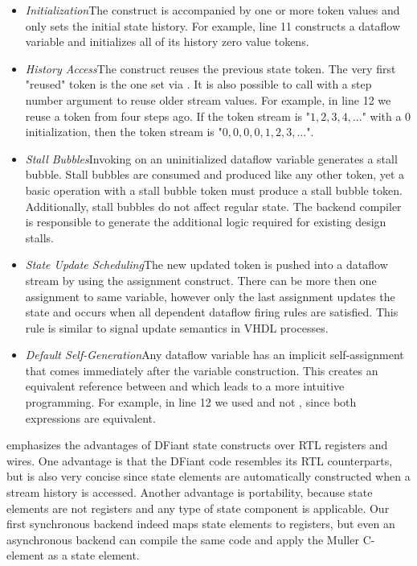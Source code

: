 \begin{itemize}[leftmargin=*]
	\item \textit{Initialization}\quad The  construct is accompanied by one or more token values and only sets the initial state history. For example, line 11 constructs a dataflow variable and initializes all of its history zero value tokens. 
	\item \textit{History Access}\quad The  construct reuses the previous state token. The very first "reused" token is the one set via . It is also possible to call  with a step number argument to reuse older stream values. For example, in line 12 we reuse a  token from four steps ago. If the  token stream is "$1,2,3,4,...$" with a $0$ initialization, then the  token stream is "$0,0,0,0,1,2,3,...$".
	\item \textit{Stall Bubbles}\quad Invoking  on an uninitialized dataflow variable generates a stall bubble. Stall bubbles are consumed and produced like any other token, yet a basic operation with a stall bubble token must produce a stall bubble token. Additionally, stall bubbles do not affect regular state. The backend compiler is responsible to generate the additional logic required for existing design stalls. 
	\item \textit{State Update Scheduling}\quad The new updated token is pushed into a dataflow stream by using the \code{:=} assignment construct. There can be more then one assignment to same variable, however only the last assignment updates the state and occurs when all dependent dataflow firing rules are satisfied. This rule is similar to signal update semantics in VHDL processes.
	\item \textit{Default Self-Generation}\quad Any dataflow  variable has an implicit self-assignment  that comes immediately after the variable construction. This creates an equivalent reference between  and  which leads to a more intuitive programming.
	For example, in line 12 we used  and not , since both expressions are equivalent.
\end{itemize} 
\vspace{0.5ex}

 emphasizes the advantages of DFiant state constructs over RTL registers and wires.
One advantage is that the DFiant code resembles its RTL counterparts, but is also very concise since state elements are automatically constructed when a stream history is accessed. Another advantage is portability, because state elements are not registers and any type of state component is applicable. Our first synchronous backend indeed maps state elements to registers, but even an asynchronous backend can compile the same code and apply the Muller C-element\cite{muller1957theory} as a state element. 


